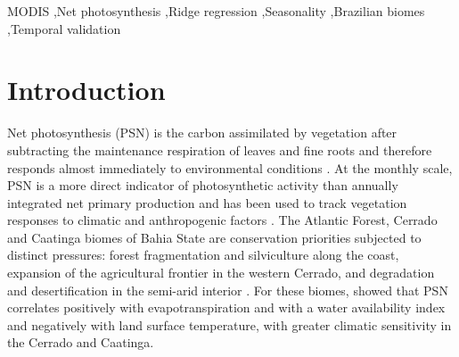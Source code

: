 \documentclass[a4paper,fleqn]{cas-sc}
\begin{document}
\begin{keywords}
MODIS \sep Net photosynthesis \sep Ridge regression \sep Seasonality \sep Brazilian biomes \sep Temporal validation
\end{keywords}

\maketitle

\section{Introduction}\label{sec:intro}

Net photosynthesis (PSN) is the carbon assimilated by vegetation after subtracting the maintenance respiration of leaves and fine roots and therefore responds almost immediately to environmental conditions \citep{running2004,running2021gpp}. At the monthly scale, PSN is a more direct indicator of photosynthetic activity than annually integrated net primary production and has been used to track vegetation responses to climatic and anthropogenic factors \citep{nemani2003,benfica2023}. The Atlantic Forest, Cerrado and Caatinga biomes of Bahia State are conservation priorities subjected to distinct pressures: forest fragmentation and silviculture along the coast, expansion of the agricultural frontier in the western Cerrado, and degradation and desertification in the semi-arid interior \citep{ribeiro2009,lima2020,marengo2018,mapbiomas2025}. For these biomes, \citet{benfica2022,benfica2023} showed that PSN correlates positively with evapotranspiration and with a water availability index and negatively with land surface temperature, with greater climatic sensitivity in the Cerrado and Caatinga.
\end{document}
